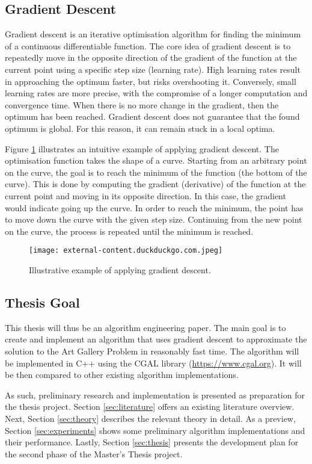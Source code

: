 \newpage
\subsection{Gradient Descent}

Gradient descent is an iterative optimisation algorithm for finding the minimum of a continuous differentiable function. The core idea of gradient descent is to repeatedly move in the opposite direction of the gradient of the function at the current point using a specific step size (learning rate). High learning rates result in approaching the optimum faster, but risks overshooting it. Conversely, small learning rates are more precise, with the compromise of a longer computation and convergence time.
When there is no more change in the gradient, then the optimum has been reached. Gradient descent does not guarantee that the found optimum is global. For this reason, it can remain stuck in a local optima.

Figure \ref{fig:gradient_descent} illustrates an intuitive example of applying gradient descent. The optimisation function takes the shape of a curve. Starting from an arbitrary point on the curve, the goal is to reach the minimum of the function (the bottom of the curve). This is done by computing the gradient (derivative) of the function at the current point and moving in its opposite direction. In this case, the gradient would indicate going up the curve. In order to reach the minimum, the point has to move down the curve with the given step size. Continuing from the new point on the curve, the process is repeated until the minimum is reached.

\begin{figure}[h!]
    \centering
    \texttt{[image: external-content.duckduckgo.com.jpeg]}
    \caption{Illustrative example of applying gradient descent.}
    \label{fig:gradient_descent}
\end{figure}

\subsection{Thesis Goal}

This thesis will thus be an algorithm engineering paper. The main goal is to create and implement an algorithm that uses gradient descent to approximate the solution to the Art Gallery Problem in reasonably fast time. The algorithm will be implemented in C++ using the CGAL library (\url{https://www.cgal.org}). It will be then compared to other existing algorithm implementations.

As such, preliminary research and implementation is presented as preparation for the thesis project. Section \ref{sec:literature} offers an existing literature overview. Next, Section \ref{sec:theory} describes the relevant theory in detail.
As a preview, Section \ref{sec:experiments} shows some preliminary algorithm implementations and their performance.
Lastly, Section \ref{sec:thesis} presents the development plan for the second phase of the Master's Thesis project.